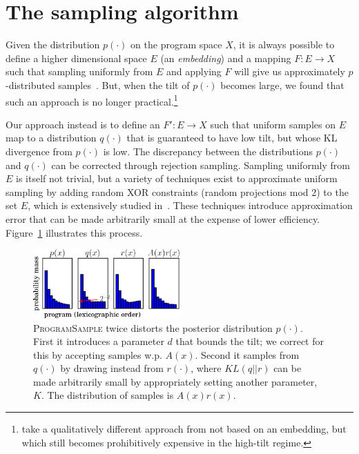 \documentclass{article}
\newcommand{\theSystem}{\textsc{ProgramSample}}
\begin{document}
 


\section{The sampling algorithm}
Given the distribution $p(\cdot )$ on the program space $X$, it is
always possible to define a higher dimensional space $E$ (an
\emph{embedding}) and a mapping $F:E\to X$ such that sampling
uniformly from $E$ and applying $F$ will give us approximately
$p$-distributed samples~\cite{ermon2013embed}.
But, when the tilt of $p(\cdot )$
becomes large, we found that such an approach is no longer practical.\footnote{\cite{AAAI148364} take a qualitatively different approach from \cite{ermon2013embed} not based on an embedding, but which still becomes prohibitively expensive in the high-tilt regime.}

Our approach instead is to define an $F':E\to X$ such that uniform
samples on $E$ map to a distribution $q(\cdot )$ that is guaranteed to
have low tilt, but whose KL divergence from $p(\cdot )$ is low. The
discrepancy between the distributions $p(\cdot )$ and $q(\cdot )$ can
be corrected through rejection sampling. Sampling uniformly from $E$
is itself not trivial, but a variety of techniques exist to
approximate uniform sampling by adding random XOR constraints (random
projections mod 2) to the set $E$, which is extensively studied
in~\cite{gomes2006near,valiant1985np,AAAI148364,gomes2006model,chakraborty2013scalable}.
These techniques introduce approximation error that can be made
arbitrarily small at the expense of lower
efficiency. Figure~\ref{cartoon} illustrates this process.
\begin{figure}\vspace{-0.5cm}\centering
  \includegraphics[width=0.5\textwidth]{cartoon_small.png}
  \caption{\theSystem{} twice distorts the posterior distribution $p(\cdot )$. First it introduces a parameter $d$ that bounds the tilt; we correct for this by accepting samples w.p. $A(x)$. Second it samples from $q(\cdot )$ by drawing instead from $r(\cdot )$, where $KL(q||r)$ can be made arbitrarily small by appropriately setting another parameter, $K$. The distribution of samples is $A(x)r(x)$.}\label{cartoon}\vspace{-0.5cm}
\end{figure}
\end{document}

